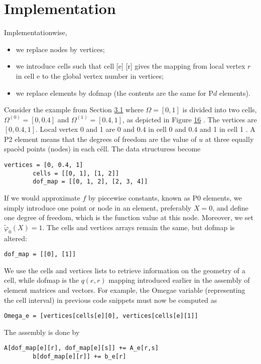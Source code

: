 \documentclass[../main.tex]{subfiles}
\begin{document}
	\section[Implementation]{Implementation}
	\label{sec:sec_6_3}
	\noindent Implementationwise,
	\begin{itemize}
		\item we replace nodes by vertices;
		\item we introduce cells such that cell [e] [r] gives the mapping from local vertex $r$ in cell e to the global vertex number in vertices;
		\item we replace elements by dof\textunderscore map (the contents are the same for $\mathrm{P} d$ elements).
	\end{itemize}
	
	\noindent Consider the example from Section \hyperref[sec:sec_3_1]{3.1} where $\Omega=[0,1]$ is divided into two cells, $\Omega^{(0)}=[0,0.4]$ and $\Omega^{(1)}=[0.4,1]$, as depicted in Figure \hyperref[fig:img_16]{16} . The vertices are $[0,0.4,1]$. Local vertex 0 and 1 are 0 and $0.4$ in cell 0 and $0.4$ and 1 in cell 1 . A P2 element means that the degrees of freedom are the value of $u$ at three equally spacèd points (nodes) in each céll. The data structuress become
	\begin{lstlisting}[numbers=none]
		vertices = [0, 0.4, 1]
		cells = [[0, 1], [1, 2]]
		dof_map = [[0, 1, 2], [2, 3, 4]]	
	\end{lstlisting}
	If we would approximate $f$ by piecewise constants, known as $\mathrm{P} 0$ elements, we simply introduce one point or node in an element, preferably $X=0$, and define one degree of freedom, which is the function value at this node. Moreover, we set $\tilde{\varphi}_{0}(X)=1$. The cells and vertices arrays remain the same, but dof\textunderscore map is altered:
	\begin{lstlisting}[numbers=none]
		dof_map = [[0], [1]]	
	\end{lstlisting}
	We use the cells and vertices lists to retrieve information on the geometry of a cell, while dof\textunderscore map is the $q(e, r)$ mapping introduced earlier in the assembly of element matrices and vectors. For example, the Omega\textunderscore e variable (representing the cell interval) in previous code snippets must now be computed as
	\begin{lstlisting}[numbers=none]
		Omega_e = [vertices[cells[e][0], vertices[cells[e][1]]	
	\end{lstlisting}
	The assembly is done by
	\begin{lstlisting}[numbers=none]
		A[dof_map[e][r], dof_map[e][s]] += A_e[r,s]
		b[dof_map[e][r]] += b_e[r]	
	\end{lstlisting}
\end{document}
